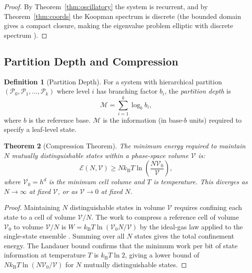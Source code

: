 \documentclass[11pt,twocolumn,a4paper]{article}
\newtheorem{theorem}{Theorem}[section]
\theoremstyle{definition}
\newtheorem{definition}[theorem]{Definition}
\theoremstyle{remark}
\newcommand{\kB}{k_{\mathrm{B}}}
\newcommand{\Mpart}{\mathcal{M}}
\begin{document}
\begin{proof}
By Theorem~\ref{thm:oscillatory} the system is recurrent, and by
Theorem~\ref{thm:coords} the Koopman spectrum is discrete (the bounded domain
gives a compact closure, making the eigenvalue problem elliptic with discrete
spectrum \citep{courant1953}).
\end{proof}

\subsection{Partition Depth and Compression}

\begin{definition}[Partition Depth]
\label{def:depth}
For a system with hierarchical partition $(\mathscr{P}_0, \mathscr{P}_1,
\ldots, \mathscr{P}_k)$ where level $i$ has branching factor $b_i$, the
\emph{partition depth} is
\begin{equation}
\Mpart = \sum_{i=1}^k \log_b b_i,
\label{eq:depth}
\end{equation}
where $b$ is the reference base. $\Mpart$ is the information (in base-$b$
units) required to specify a leaf-level state.
\end{definition}

\begin{theorem}[Compression Theorem]
\label{thm:compression}
The minimum energy required to maintain $N$ mutually distinguishable states
within a phase-space volume $\mathcal{V}$ is:
\begin{equation}
\mathcal{E}(N, \mathcal{V}) \geq N\kB T\ln\!\left(\frac{N\mathcal{V}_0}{\mathcal{V}}\right),
\label{eq:compression}
\end{equation}
where $\mathcal{V}_0 = h^d$ is the minimum cell volume and $T$ is temperature.
This diverges as $N \to \infty$ at fixed $\mathcal{V}$, or as $\mathcal{V} \to 0$
at fixed $N$.
\end{theorem}

\begin{proof}
Maintaining $N$ distinguishable states in volume $\mathcal{V}$ requires
confining each state to a cell of volume $\mathcal{V}/N$. The work to compress
a reference cell of volume $\mathcal{V}_0$ to volume $\mathcal{V}/N$ is
$W = \kB T \ln(\mathcal{V}_0 N / \mathcal{V})$ by the ideal-gas law applied
to the single-state ensemble \citep{landauer1961}. Summing over all $N$ states
gives the total confinement energy. The Landauer bound \citep{landauer1961}
confirms that the minimum work per bit of state information at temperature $T$
is $\kB T \ln 2$, giving a lower bound of $N\kB T \ln(N\mathcal{V}_0/\mathcal{V})$
for $N$ mutually distinguishable states.
\end{proof}
\end{document}
